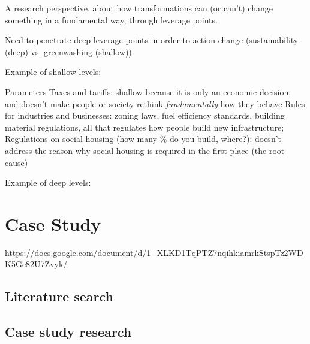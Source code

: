 \documentclass{article}
\begin{document}
A research perspective, about how transformations can (or can't) change something in a fundamental way, through leverage points.

Need to penetrate deep leverage points in order to action change (sustainability (deep) vs. greenwashing (shallow)).

Example of shallow levels: 
\begin{outline}
	\1 Parameters
		\2 Taxes and tariffs: shallow because it is only an economic decision, and doesn't make people or society rethink \textit{fundamentally} how they behave
		\2 Rules for industries and businesses: zoning laws, fuel efficiency standards, building material regulations, all that regulates how people build new infrastructure;
		\2 Regulations on social housing (how many \% do you build, where?): doesn't address the reason why social housing is required in the first place (the root cause)
\end{outline}

Example of deep levels: 
\begin{outline}
	\1 
\end{outline}

\section{Case Study}

\url{https://docs.google.com/document/d/1_XLKD1TqPTZ7nqihkiamrkStspTz2WDK5Ge82U7Zvyk/}

\subsection{Literature search}

\subsubsection{ \textit{}}
\begin{outline}
	\1
\end{outline}

\subsection{Case study research}

\pagebreak

\end{document}
